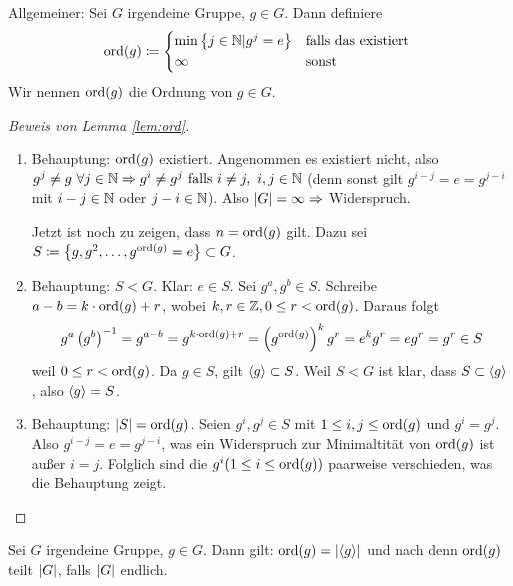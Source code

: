\documentclass[12pt,a4paper]{scrartcl}
\begin{document}
\begin{defi}
	Allgemeiner: Sei $G$ irgendeine Gruppe, $g \in G$. Dann definiere \begin{equation*}
		\ord(g) \coloneqq \begin{cases*}
		\min \left\lbrace j \in \IN | g^j = e\right\rbrace &falls das existiert \\
		\infty &sonst
		\end{cases*}
	\end{equation*}
	Wir nennen $\operatorname{ord}(g)$ die Ordnung von $g \in G$.
\end{defi}

\begin{proof} [Beweis von Lemma \ref{lem:ord}]
	\begin{enumerate}
	\item Behauptung: $\operatorname{ord}(g)$ existiert. Angenommen es existiert nicht, also 
	$
		g^j \not = g ~ \forall j \in \mathbb N \Rightarrow g^i \neq g^j \text{ falls } i \neq j, ~ i,j \in \mathbb N 
	$
	(denn sonst gilt $g^{i-j}=e=g^{j-i}$ mit $i-j \in \mathbb N$ oder $j-i \in \mathbb N$).
	Also $\lvert G\rvert = \infty \Rightarrow$ Widerspruch.
	
	Jetzt ist noch zu zeigen, dass $n = \operatorname{ord}(g)$ gilt. Dazu sei $S \coloneqq \left\lbrace g, g^2, \ldots, g^{\operatorname{ord}(g)} = e \right\rbrace \subset G$.
	
	\item Behauptung: $S < G$. Klar: $e \in S$. Sei $g^a, g^b \in S$. Schreibe $a-b = k \cdot \operatorname{ord}(g) + r$, wobei $k, r \in \mathbb Z, 0 \leq r < \operatorname{ord}(g)$. Daraus folgt
	\begin{equation*}
		g^a\left( g^b \right)^{-1}=g^{a-b}=g^{k \cdot \operatorname{ord}(g)+r}
		= \left(g^{\operatorname{ord}(g)} \right)^kg^r = e^kg^r=eg^r=g^r \in S
	\end{equation*}
	weil $0 \leq r < \operatorname{ord}(g)$.
	Da $g \in S$, gilt $\langle g\rangle\subset S$. Weil $S < G$ ist klar, dass $S \subset \langle g\rangle$, also $\langle g\rangle = S$.
	\item Behauptung: $\lvert S\rvert = \operatorname{ord}(g)$. Seien $g^i, g^j \in S$ mit $1 \leq i,j \leq \operatorname{ord}(g)$ und $g^i=g^j$. Also $g^{i-j} = e = g^{j-i}$, was ein Widerspruch zur Minimaltität von $\operatorname{ord}(g)$ ist außer $i=j$. Folglich sind die $g^i (1\leq i \leq \operatorname{ord}(g))$ paarweise verschieden, was die Behauptung zeigt.
	\qedhere
	\end{enumerate}
\end{proof}

\begin{bem}
	Sei $G$ irgendeine Gruppe, $g\in G$. Dann gilt: $\operatorname{ord}(g) = \lvert\langle g\rangle\rvert$ und nach  denn $\operatorname{ord}(g)$ teilt $\lvert G\rvert$, falls $\lvert G\rvert$ endlich.
\end{bem}
\end{document}
